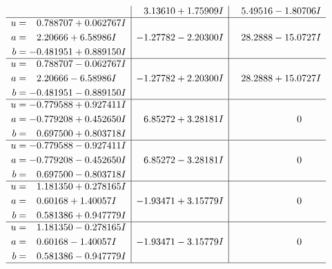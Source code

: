 \documentclass[1p]{elsarticle_modified}
\theoremstyle{definition}
\begin{document}
$$\begin{array}{c|c|c}
 & \phantom{-}3.13610 + 1.75909 I & \phantom{-}5.49516 - 1.80706 I \\ \hline\begin{aligned}
u &= \phantom{-}0.788707 + 0.062767 I \\
a &= \phantom{-}2.20666 + 6.58986 I \\
b &= -0.481951 + 0.889150 I\end{aligned}
 & -1.27782 - 2.20300 I & \phantom{-}28.2888 - 15.0727 I \\ \hline\begin{aligned}
u &= \phantom{-}0.788707 - 0.062767 I \\
a &= \phantom{-}2.20666 - 6.58986 I \\
b &= -0.481951 - 0.889150 I\end{aligned}
 & -1.27782 + 2.20300 I & \phantom{-}28.2888 + 15.0727 I \\ \hline\begin{aligned}
u &= -0.779588 + 0.927411 I \\
a &= -0.779208 + 0.452650 I \\
b &= \phantom{-}0.697500 + 0.803718 I\end{aligned}
 & \phantom{-}6.85272 + 3.28181 I & \phantom{-0.000000 } 0 \\ \hline\begin{aligned}
u &= -0.779588 - 0.927411 I \\
a &= -0.779208 - 0.452650 I \\
b &= \phantom{-}0.697500 - 0.803718 I\end{aligned}
 & \phantom{-}6.85272 - 3.28181 I & \phantom{-0.000000 } 0 \\ \hline\begin{aligned}
u &= \phantom{-}1.181350 + 0.278165 I \\
a &= \phantom{-}0.60168 + 1.40057 I \\
b &= \phantom{-}0.581386 + 0.947779 I\end{aligned}
 & -1.93471 + 3.15779 I & \phantom{-0.000000 } 0 \\ \hline\begin{aligned}
u &= \phantom{-}1.181350 - 0.278165 I \\
a &= \phantom{-}0.60168 - 1.40057 I \\
b &= \phantom{-}0.581386 - 0.947779 I\end{aligned}
 & -1.93471 - 3.15779 I & \phantom{-0.000000 } 0\\
 \hline 
 \end{array}$$\newpage$$\begin{array}{c|c|c}  

\end{array}$$
\end{document}
